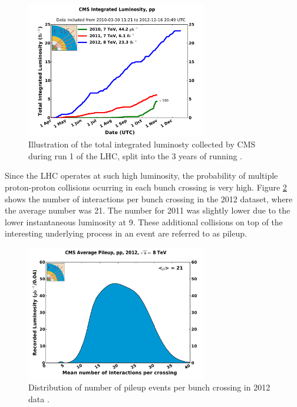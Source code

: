 \begin{figure}[htbp]
   \includegraphics[width=0.7\textwidth]{plots/detector/int_lumi_cumulative_pp_2.pdf}
\caption{Illustration of the total integrated luminosty collected by CMS during run 1 of the
LHC, split into the 3 years of running \cite{cmslumitwiki}.}
\label{fig:detlumi}
\end{figure}

Since the LHC operates at such high luminosity, the probability of multiple
proton-proton collisions ocurring in each bunch crossing is very high. Figure 
\ref{fig:PU} shows the number of interactions per bunch crossing in the
2012 dataset, where the average number was 21. The number for 2011 was slightly
lower due to the lower instantaneous luminosity at 9. 
These additional collisions on top of the interesting
underlying process in an event are referred to as pileup.

\begin{figure}[htbp]
   \includegraphics[width=0.7\textwidth]{plots/detector/pileup_pp_2012-2.pdf}
\caption{Distribution of number of pileup events per bunch crossing in 2012 data \cite{cmslumitwiki}.}
\label{fig:PU}
\end{figure}

